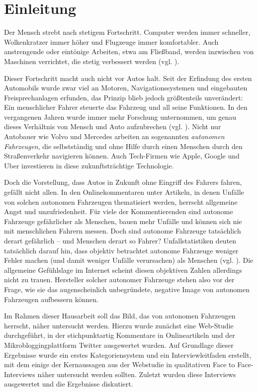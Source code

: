 \section{Einleitung}

Der Mensch strebt nach stetigem Fortschritt. Computer werden immer schneller, Wolkenkratzer immer höher und Flugzeuge immer komfortabler. Auch anstrengende oder eintönige Arbeiten, etwa am Fließband, werden inzwischen von Maschinen verrichtet, die stetig verbessert werden (vgl. \cite{makino1994new}).

Dieser Fortschritt macht auch nicht vor Autos halt. Seit der Erfindung des ersten Automobils wurde zwar viel an Motoren, Navigationssystemen und eingebauten Freisprechanlagen erfunden, das Prinzip blieb jedoch größtenteils unverändert: Ein menschlicher Fahrer steuerte das Fahrzeug und all seine Funktionen. In den vergangenen Jahren wurde immer mehr Forschung unternommen, um genau dieses Verhältnis von Mensch und Auto aufzubrechen (vgl. \cite{wei2013towards}). Nicht nur Autobauer wie Volvo und Mercedes arbeiten an sogenannten \emph{autonomen Fahrzeugen}, die selbstständig und ohne Hilfe durch einen Menschen durch den Straßenverkehr navigieren können. Auch Tech-Firmen wie Apple, Google und Uber investieren in diese zukunftsträchtige Technologie.

Doch die Vorstellung, dass Autos in Zukunft ohne Eingriff des Fahrers fahren, gefällt nicht allen. In den Onlinekommentaren unter Artikeln, in denen Unfälle von solchen autonomen Fahrzeugen thematisiert werden, herrscht allgemeine Angst und unzufriedenheit. Für viele der Kommentierenden sind autonome Fahrzeuge gefährlicher als Menschen, bauen mehr Unfälle und können sich nie mit menschlichen Fahrern messen. Doch sind autonome Fahrzeuge tatsächlich derart gefährlich -- und Menschen derart so Fahrer? Unfallstatistiken deuten tatsächlich darauf hin, dass objektiv betrachtet autonome Fahrzeuge weniger Fehler machen (und damit weniger Unfälle verursachen) als Menschen (vgl. \cite{singh2015critical}). Die allgemeine Gefühlslage im Internet scheint diesen objektiven Zahlen allerdings nicht zu trauen. Hersteller solcher autonomer Fahrzeuge stehen also vor der Frage, wie sie das augenscheinlich unbegründete, negative Image von autonomen Fahrzeugen aufbessern können.

Im Rahmen dieser Hausarbeit soll das Bild, das von autonomen Fahrzeugen herrscht, näher untersucht werden. Hierzu wurde zunächst eine Web-Studie durchgeführt, in der stichpunktartig Kommentare in Onlineartikeln und der Mikrobloggingplattform Twitter ausgewertet wurden. Auf Grundlage dieser Ergebnisse wurde ein erstes Kategoriensystem und ein Interviewleitfaden erstellt, mit dem einige der Kernaussagen aus der Webstudie in qualitativen Face to Face-Interviews näher untersucht werden sollten. Zuletzt wurden diese Interviews ausgewertet und die Ergebnisse diskutiert.